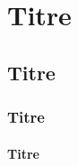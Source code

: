 \documentclass{article}
\begin{document}
\section{Titre}

\subsection{Titre}

\subsubsection{Titre}

\paragraph{Titre}
\end{document}
